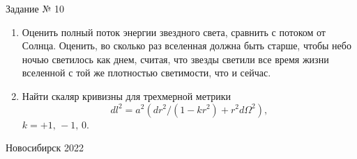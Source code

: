 \documentclass[12pt,pagesize,paper=192mm:108mm,landscape]{scrbook}
\begin{document}
\begin{titlepage}
  \vspace*{-0.5em}
  \begin{center}    




    \vfill
    \Large
    Задание № 10
 \bigskip

    \normalsize
    \begin{minipage}{0.75\linewidth}
      \begin{enumerate}
      \item Оценить полный поток энергии звездного света, сравнить с
        потоком от Солнца. Оценить, во сколько раз вселенная должна
        быть старше, чтобы небо ночью светилось как днем, считая, что
        звезды светили все время жизни вселенной с той же плотностью
        светимости, что и сейчас.

	\item Найти скаляр кривизны для трехмерной метрики \[dl^2 = a^2\left(dr^2/\left(1 - kr^2\right) + r^2d\Omega^2\right),\] \(k = +1,\, -1,\, 0\).
      \end{enumerate}
    \end{minipage}
    \vfill

     \normalsize \ccbysa\hspace{0.5em}  Новосибирск 2022
  \end{center}
\end{titlepage}
\end{document}
